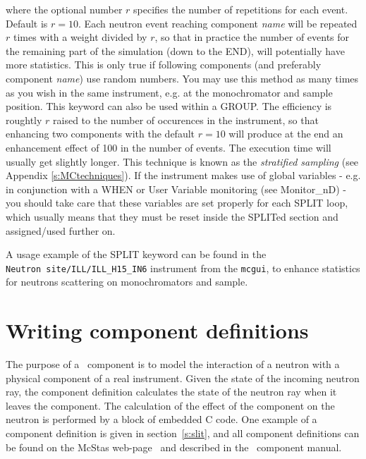 where the optional number $r$ specifies the number of repetitions for each event. Default is $r=10$.
Each neutron event reaching component {\it name} will be repeated $r$ times with a weight divided by $r$, so that in practice the number of events for the remaining part of the simulation (down to the END), will potentially have more statistics. This is only true if following components (and preferably component {\it name}) use random numbers. You may use this method as many times as you wish in the same instrument, e.g. at the monochromator and sample position. This keyword can also be used within a GROUP. The efficiency is roughtly $r$ raised to the number of occurences in the instrument, so that enhancing two components with the default $r=10$ will produce at the end an enhancement effect of 100 in the number of events. The execution time will usually get slightly longer. This technique is known as the \emph{stratified sampling} (see Appendix \ref{s:MCtechniques}). If the instrument makes use of global variables - e.g. in conjunction with a WHEN or User Variable monitoring (see Monitor\_nD) - you should take care that these variables are set properly for each SPLIT loop, which usually means that they must be reset inside the SPLITed section and assigned/used further on. 

A usage example of the SPLIT keyword can be found in the \\
\verb+Neutron site/ILL/ILL_H15_IN6+ instrument from the \verb+mcgui+, to enhance statistics for neutrons scattering on monochromators and sample.

\section{Writing component definitions}
\label{s:compdefs}

The purpose of a \MCS\ component is to model the interaction of a
neutron with a physical component of a real instrument. Given the
state of the incoming neutron ray, the
component definition calculates the state of the neutron ray when it leaves
the component.  The calculation of the effect of the component on the
neutron is performed by a block of embedded C code.
One example of a component definition is given in section~\ref{s:slit}, and all
component definitions can be found on the McStas
web-page~\cite{mcstas_webpage} and described in the \MCS\ component manual.

